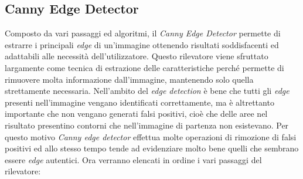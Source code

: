 \subsection {Canny Edge Detector}
Composto da vari passaggi ed algoritmi, il \textit{Canny Edge Detector} permette di estrarre i principali \textit{edge} di un'immagine ottenendo risultati soddisfacenti ed adattabili alle necessità dell'utilizzatore.
Questo rilevatore viene sfruttato largamente come tecnica di estrazione delle caratteristiche perché permette di rimuovere molta informazione dall'immagine, mantenendo solo quella strettamente necessaria.
Nell'ambito del \textit{edge detection} è bene che tutti gli \textit{edge} presenti nell'immagine vengano identificati correttamente, ma è altrettanto importante che non vengano generati falsi positivi, cioè che delle aree nel risultato presentino contorni che nell'immagine di partenza non esistevano.
Per questo motivo \textit{Canny edge detector} effettua molte operazioni di rimozione di falsi positivi ed allo stesso tempo tende ad evidenziare molto bene quelli che sembrano essere \textit{edge} autentici.
Ora verranno elencati in ordine i vari passaggi del rilevatore:

